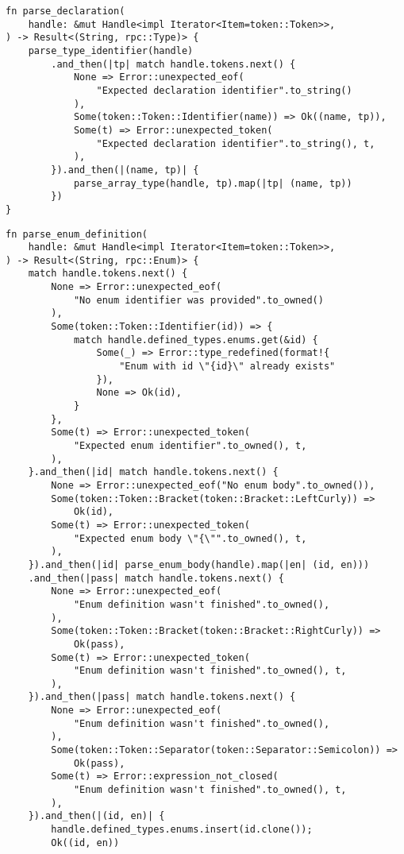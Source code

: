 \begin{lstlisting}[caption={Разбор объявления}, label={lst:rust_parser_declaration}]
fn parse_declaration(
    handle: &mut Handle<impl Iterator<Item=token::Token>>,
) -> Result<(String, rpc::Type)> {
    parse_type_identifier(handle)
        .and_then(|tp| match handle.tokens.next() {
            None => Error::unexpected_eof(
                "Expected declaration identifier".to_string()
            ),
            Some(token::Token::Identifier(name)) => Ok((name, tp)),
            Some(t) => Error::unexpected_token(
                "Expected declaration identifier".to_string(), t,
            ),
        }).and_then(|(name, tp)| {
            parse_array_type(handle, tp).map(|tp| (name, tp))
        })
}
\end{lstlisting}
\clearpage
\begin{lstlisting}[caption={Разбор enum (часть 1)}, label={lst:rust_parser_enum1}]
fn parse_enum_definition(
    handle: &mut Handle<impl Iterator<Item=token::Token>>,
) -> Result<(String, rpc::Enum)> {
    match handle.tokens.next() {
        None => Error::unexpected_eof(
            "No enum identifier was provided".to_owned()
        ),
        Some(token::Token::Identifier(id)) => {
            match handle.defined_types.enums.get(&id) {
                Some(_) => Error::type_redefined(format!{
                    "Enum with id \"{id}\" already exists"
                }),
                None => Ok(id),
            }
        },
        Some(t) => Error::unexpected_token(
            "Expected enum identifier".to_owned(), t,
        ),
    }.and_then(|id| match handle.tokens.next() {
        None => Error::unexpected_eof("No enum body".to_owned()),
        Some(token::Token::Bracket(token::Bracket::LeftCurly)) =>
            Ok(id),
        Some(t) => Error::unexpected_token(
            "Expected enum body \"{\"".to_owned(), t,
        ),
    }).and_then(|id| parse_enum_body(handle).map(|en| (id, en)))
    .and_then(|pass| match handle.tokens.next() {
        None => Error::unexpected_eof(
            "Enum definition wasn't finished".to_owned(),
        ),
        Some(token::Token::Bracket(token::Bracket::RightCurly)) =>
            Ok(pass),
        Some(t) => Error::unexpected_token(
            "Enum definition wasn't finished".to_owned(), t,
        ),
    }).and_then(|pass| match handle.tokens.next() {
        None => Error::unexpected_eof(
            "Enum definition wasn't finished".to_owned(),
        ),
        Some(token::Token::Separator(token::Separator::Semicolon)) =>
            Ok(pass),
        Some(t) => Error::expression_not_closed(
            "Enum definition wasn't finished".to_owned(), t,
        ),
    }).and_then(|(id, en)| {
        handle.defined_types.enums.insert(id.clone());
        Ok((id, en))
\end{lstlisting}
